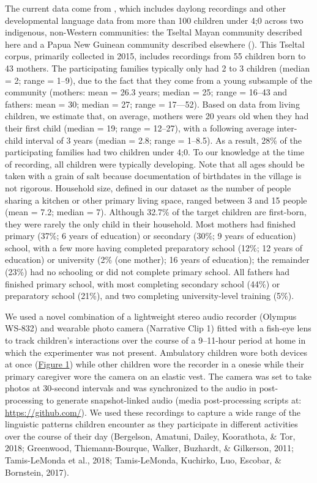 \documentclass[floatsintext,man]{apa6}
\theoremstyle{definition}
\theoremstyle{definition}
\theoremstyle{definition}
\theoremstyle{remark}
\begin{document}
The current data come from , which includes daylong recordings and other
developmental language data from more than 100 children under 4;0 across
two indigenous, non-Western communities: the Tseltal Mayan community
described here and a Papua New Guinean community described elsewhere ().
This Tseltal corpus, primarily collected in 2015, includes recordings
from 55 children born to 43 mothers. The participating families
typically only had 2 to 3 children (median = 2; range = 1--9), due to
the fact that they come from a young subsample of the community
(mothers: mean = 26.3 years; median = 25; range = 16--43 and fathers:
mean = 30; median = 27; range = 17---52). Based on data from living
children, we estimate that, on average, mothers were 20 years old when
they had their first child (median = 19; range = 12--27), with a
following average inter-child interval of 3 years (median = 2.8; range =
1--8.5). As a result, 28\% of the participating families had two
children under 4;0. To our knowledge at the time of recording, all
children were typically developing. Note that all ages should be taken
with a grain of salt because documentation of birthdates in the village
is not rigorous. Household size, defined in our dataset as the number of
people sharing a kitchen or other primary living space, ranged between 3
and 15 people (mean = 7.2; median = 7). Although 32.7\% of the target
children are first-born, they were rarely the only child in their
household. Most mothers had finished primary (37\%; 6 years of
education) or secondary (30\%; 9 years of education) school, with a few
more having completed preparatory school (12\%; 12 years of education)
or university (2\% (one mother); 16 years of education); the remainder
(23\%) had no schooling or did not complete primary school. All fathers
had finished primary school, with most completing secondary school
(44\%) or preparatory school (21\%), and two completing university-level
training (5\%).

We used a novel combination of a lightweight stereo audio recorder
(Olympus WS-832) and wearable photo camera (Narrative Clip 1) fitted
with a fish-eye lens to track children's interactions over the course of
a 9--11-hour period at home in which the experimenter was not present.
Ambulatory children wore both devices at once
(\protect\hyperlink{fig1}{Figure 1}) while other children wore the
recorder in a onesie while their primary caregiver wore the camera on an
elastic vest. The camera was set to take photos at 30-second intervals
and was synchronized to the audio in post-processing to generate
snapshot-linked audio (media post-processing scripts at:
\url{https://github.com/}). We used these recordings to capture a wide
range of the linguistic patterns children encounter as they participate
in different activities over the course of their day (Bergelson,
Amatuni, Dailey, Koorathota, \& Tor, 2018; Greenwood, Thiemann-Bourque,
Walker, Buzhardt, \& Gilkerson, 2011; Tamis-LeMonda et al., 2018;
Tamis-LeMonda, Kuchirko, Luo, Escobar, \& Bornstein, 2017).
\end{document}
